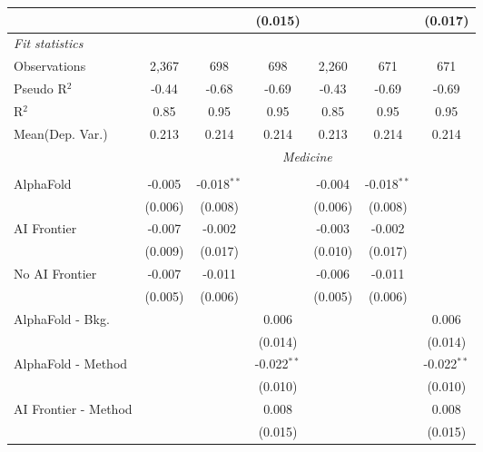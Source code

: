 \begin{tabular}{lcccccc}
                           &         &                & (0.015)        &         &                & (0.017)\\   
   \midrule
   \emph{Fit statistics}\\
   Observations            & 2,367   & 698            & 698            & 2,260   & 671            & 671\\  
   Pseudo R$^2$            & -0.44   & -0.68          & -0.69          & -0.43   & -0.69          & -0.69\\  
   R$^2$                   & 0.85    & 0.95           & 0.95           & 0.85    & 0.95           & 0.95\\  
   
Mean(Dep. Var.) & 0.213 & 0.214 & 0.214 & 0.213 & 0.214 & 0.214 \\
 & \multicolumn{6}{c}{\textit{Medicine}} \\ \\
   AlphaFold               & -0.005  & -0.018$^{**}$ &               & -0.004  & -0.018$^{**}$ &   \\   
                           & (0.006) & (0.008)       &               & (0.006) & (0.008)       &   \\   
   AI Frontier             & -0.007  & -0.002        &               & -0.003  & -0.002        &   \\   
                           & (0.009) & (0.017)       &               & (0.010) & (0.017)       &   \\   
   No AI Frontier          & -0.007  & -0.011        &               & -0.006  & -0.011        &   \\   
                           & (0.005) & (0.006)       &               & (0.005) & (0.006)       &   \\   
   AlphaFold - Bkg.        &         &               & 0.006         &         &               & 0.006\\   
                           &         &               & (0.014)       &         &               & (0.014)\\   
   AlphaFold - Method      &         &               & -0.022$^{**}$ &         &               & -0.022$^{**}$\\   
                           &         &               & (0.010)       &         &               & (0.010)\\   
   AI Frontier - Method    &         &               & 0.008         &         &               & 0.008\\   
                           &         &               & (0.015)       &         &               & (0.015)\\   

\end{tabular}
